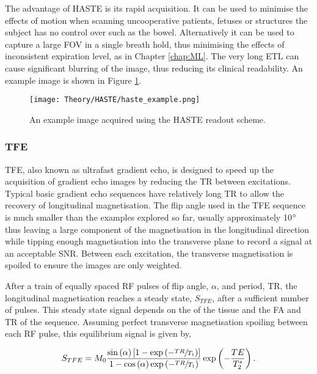 The advantage of \ac{HASTE} is its rapid acquisition. It can be used to minimise the effects of motion when scanning uncooperative patients, fetuses or structures the subject has no control over such as the bowel. Alternatively it can be used to capture a large \ac{FOV} in a single breath hold, thus minimising the effects of inconsistent expiration level, as in Chapter \ref{chap:ML}. The very long \ac{ETL} can cause significant blurring of the image, thus reducing its clinical readability. An example image is shown in Figure \ref{fig:theory_haste_example}.

\begin{figure}[H]
	\centering
	\texttt{[image: Theory/HASTE/haste\_example.png]}
	\caption{An example image acquired using the \ac{HASTE} readout scheme.}
	\label{fig:theory_haste_example}
\end{figure}

\subsubsection{\ac*{TFE}}
\ac{TFE}, also known as ultrafast gradient echo, is designed to speed up the acquisition of gradient echo images by reducing the \ac{TR} between excitations. Typical basic gradient echo sequences have relatively long \ac{TR} to allow the recovery of longitudinal magnetisation. The flip angle used in the \ac{TFE} sequence is much smaller than the examples explored so far, usually approximately 10$\degree$ thus leaving a large component of the magnetisation in the longitudinal direction while tipping enough magnetisation into the transverse plane to record a signal at an acceptable \ac{SNR}. Between each excitation, the transverse magnetisation is spoiled to ensure the images are only \tone weighted. 

After a train of equally spaced \ac{RF} pulses of flip angle, $\alpha$, and period, \ac{TR}, the longitudinal magnetisation reaches a steady state, $S_{TFE}$, after a sufficient number of pulses. This steady state signal depends on the \tone of the tissue and the \ac{FA} and \ac{TR} of the sequence. Assuming perfect transverse magnetisation spoiling between each \ac{RF} pulse, this equilibrium signal is given by,

\begin{equation}
	S_{TFE} = M_0 \frac{\sin \left( \alpha \right) \left[ 1 - \exp \left( -\sfrac{TR}{T_1}\right) \right]}{1-\cos \left( \alpha \right) \exp \left( -\sfrac{TR}{T_1}\right)} \exp \left( - \frac{TE}{T_2^*}\right).
	\label{eq:tfe_signal}
\end{equation}

